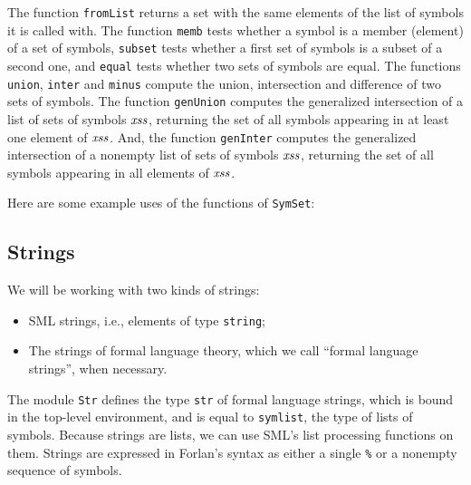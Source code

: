 The function \texttt{fromList} returns a set with the same elements of
the list of symbols it is called with.  The function \texttt{memb}
tests whether a symbol is a member (element) of a set of symbols,
\texttt{subset} tests whether a first set of symbols is a subset of a
second one, and \texttt{equal} tests whether two sets of symbols are
equal.  The functions \texttt{union}, \texttt{inter} and
\texttt{minus} compute the union, intersection and difference of two
sets of symbols.  The function \texttt{genUnion} computes the
generalized intersection of a list of sets of symbols ${\it xss}$,
returning the set of all symbols appearing in at least one element of
${\it xss}$.  And, the function \texttt{genInter} computes the generalized
intersection of a nonempty list of sets of symbols ${\it xss}$, returning
the set of all symbols appearing in all elements of ${\it xss}$.

Here are some example uses of the functions of \texttt{SymSet}:


\subsection{Strings}

We will be working with two kinds of strings:
\begin{itemize}
\item SML strings, i.e., elements of type \texttt{string};

\item The strings of formal language theory, which we call
``formal language strings'', when necessary.
\end{itemize}

The module \texttt{Str}
%
defines the type \texttt{str} of formal language
%
%
%
strings, which is bound in the top-level environment, and is
equal to \texttt{sym\;list}, the type of lists of symbols.
Because strings are lists, we can use SML's list processing functions
on them.
Strings are expressed in Forlan's syntax as either a
single \texttt{\%} or a nonempty sequence of symbols.
%
%

